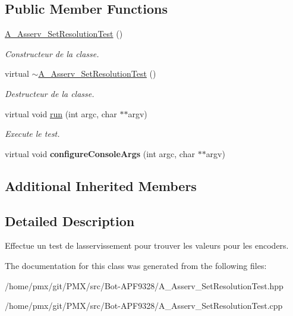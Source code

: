 \subsection*{Public Member Functions}
\begin{DoxyCompactItemize}
\item 
\mbox{\label{classA__Asserv__SetResolutionTest_ac35a4a898f89a405e079a3eb57010fdf}} 
\hyperlink{classA__Asserv__SetResolutionTest_ac35a4a898f89a405e079a3eb57010fdf}{A\+\_\+\+Asserv\+\_\+\+Set\+Resolution\+Test} ()
\begin{DoxyCompactList}\small\item\em Constructeur de la classe. \end{DoxyCompactList}\item 
\mbox{\label{classA__Asserv__SetResolutionTest_ad6b7f5c269825856de20caeb3b7a1cdb}} 
virtual \hyperlink{classA__Asserv__SetResolutionTest_ad6b7f5c269825856de20caeb3b7a1cdb}{$\sim$\+A\+\_\+\+Asserv\+\_\+\+Set\+Resolution\+Test} ()
\begin{DoxyCompactList}\small\item\em Destructeur de la classe. \end{DoxyCompactList}\item 
\mbox{\label{classA__Asserv__SetResolutionTest_a545e3f61effce9ada7362c956fa7b5d0}} 
virtual void \hyperlink{classA__Asserv__SetResolutionTest_a545e3f61effce9ada7362c956fa7b5d0}{run} (int argc, char $\ast$$\ast$argv)
\begin{DoxyCompactList}\small\item\em Execute le test. \end{DoxyCompactList}\item 
\mbox{\label{classA__Asserv__SetResolutionTest_ae55ca185b0f71ca095aa359202109cb2}} 
virtual void {\bfseries configure\+Console\+Args} (int argc, char $\ast$$\ast$argv)
\end{DoxyCompactItemize}
\subsection*{Additional Inherited Members}


\subsection{Detailed Description}
Effectue un test de l\textquotesingle{}asservissement pour trouver les valeurs pour les encoders. 

The documentation for this class was generated from the following files\+:\begin{DoxyCompactItemize}
\item 
/home/pmx/git/\+P\+M\+X/src/\+Bot-\/\+A\+P\+F9328/A\+\_\+\+Asserv\+\_\+\+Set\+Resolution\+Test.\+hpp\item 
/home/pmx/git/\+P\+M\+X/src/\+Bot-\/\+A\+P\+F9328/A\+\_\+\+Asserv\+\_\+\+Set\+Resolution\+Test.\+cpp\end{DoxyCompactItemize}
